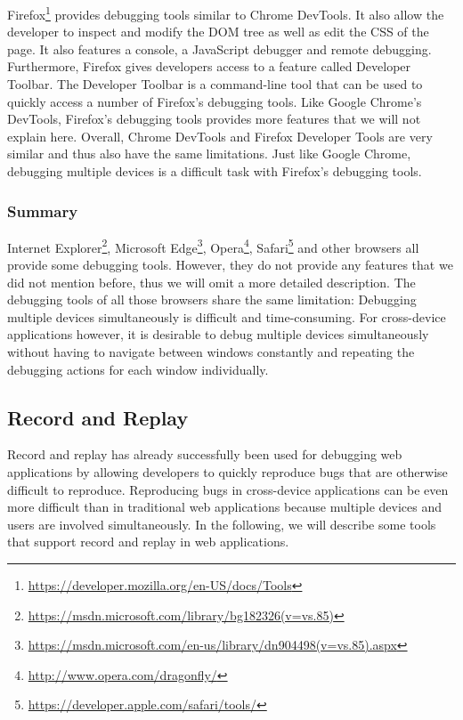 Firefox\footnote{\url{https://developer.mozilla.org/en-US/docs/Tools}} provides debugging tools similar to Chrome DevTools. It also allow the developer to inspect and modify the DOM tree as well as edit the CSS of the page. It also features a console, a JavaScript debugger and remote debugging. Furthermore, Firefox gives developers access to a feature called Developer Toolbar. The Developer Toolbar is a command-line tool that can be used to quickly access a number of Firefox's debugging tools. Like Google Chrome's DevTools, Firefox's debugging tools provides more features that we will not explain here.  Overall, Chrome DevTools and Firefox Developer Tools are very similar and thus also have the same limitations. Just like Google Chrome, debugging multiple devices is a difficult task with Firefox's debugging tools.

\subsubsection{Summary}

Internet Explorer\footnote{\url{https://msdn.microsoft.com/library/bg182326(v=vs.85)}}, Microsoft Edge\footnote{\url{https://msdn.microsoft.com/en-us/library/dn904498(v=vs.85).aspx}}, Opera\footnote{\url{http://www.opera.com/dragonfly/}}, Safari\footnote{\url{https://developer.apple.com/safari/tools/}} and other browsers all provide some debugging tools. However, they do not provide any features that we did not mention before, thus we will omit a more detailed description. The debugging tools of all those browsers share the same limitation: Debugging multiple devices simultaneously is difficult and time-consuming. For cross-device applications however, it is desirable to debug multiple devices simultaneously without having to navigate between windows constantly and repeating the debugging actions for each window individually.

\subsection{Record and Replay}

Record and replay has already successfully been used for debugging web applications by allowing developers to quickly reproduce bugs that are otherwise difficult to reproduce. Reproducing bugs in cross-device applications can be even more difficult than in traditional web applications because multiple devices and users are involved simultaneously. In the following, we will describe some tools that support record and replay in web applications.

